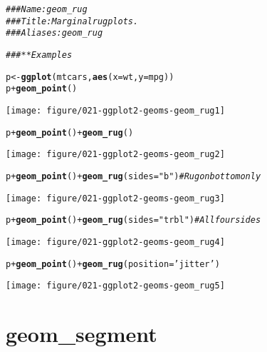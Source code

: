 \documentclass[a4paper,titlepage]{tufte-handout}\usepackage[]{graphicx}\usepackage[]{color}
\makeatletter
\def\maxwidth{ %
  \ifdim\Gin@nat@width>\linewidth
    \linewidth
  \else
    \Gin@nat@width
  \fi
}
\newcommand{\hlstr}[1]{\textcolor[rgb]{0.192,0.494,0.8}{#1}}%
\newcommand{\hlcom}[1]{\textcolor[rgb]{0.678,0.584,0.686}{\textit{#1}}}%
\newcommand{\hlopt}[1]{\textcolor[rgb]{0,0,0}{#1}}%
\newcommand{\hlstd}[1]{\textcolor[rgb]{0.345,0.345,0.345}{#1}}%
\newcommand{\hlkwb}[1]{\textcolor[rgb]{0.69,0.353,0.396}{#1}}%
\newcommand{\hlkwc}[1]{\textcolor[rgb]{0.333,0.667,0.333}{#1}}%
\newcommand{\hlkwd}[1]{\textcolor[rgb]{0.737,0.353,0.396}{\textbf{#1}}}%
\newenvironment{kframe}{%
 \def\at@end@of@kframe{}%
 \ifinner\ifhmode%
  \def\at@end@of@kframe{\end{minipage}}%
  \begin{minipage}{\columnwidth}%
 \fi\fi%
 \def\FrameCommand##1{\hskip\@totalleftmargin \hskip-\fboxsep
 \colorbox{shadecolor}{##1}\hskip-\fboxsep
     \hskip-\linewidth \hskip-\@totalleftmargin \hskip\columnwidth}%
 \MakeFramed {\advance\hsize-\width
   \@totalleftmargin\z@ \linewidth\hsize
   \@setminipage}}%
 {\par\unskip\endMakeFramed%
 \at@end@of@kframe}
\newenvironment{knitrout}{}{} %
\makeatother
\begin{document}
\begin{knitrout}
\color{fgcolor}\begin{kframe}
\begin{alltt}
\hlcom{### Name: geom_rug}
\hlcom{### Title: Marginal rug plots.}
\hlcom{### Aliases: geom_rug}

\hlcom{### ** Examples}

\hlstd{p} \hlkwb{<-} \hlkwd{ggplot}\hlstd{(mtcars,} \hlkwd{aes}\hlstd{(}\hlkwc{x}\hlstd{=wt,} \hlkwc{y}\hlstd{=mpg))}
\hlstd{p} \hlopt{+} \hlkwd{geom_point}\hlstd{()}
\end{alltt}
\end{kframe}
\texttt{[image: figure/021-ggplot2-geoms-geom\_rug1]} 
\begin{kframe}\begin{alltt}
\hlstd{p} \hlopt{+} \hlkwd{geom_point}\hlstd{()} \hlopt{+} \hlkwd{geom_rug}\hlstd{()}
\end{alltt}
\end{kframe}
\texttt{[image: figure/021-ggplot2-geoms-geom\_rug2]} 
\begin{kframe}\begin{alltt}
\hlstd{p} \hlopt{+} \hlkwd{geom_point}\hlstd{()} \hlopt{+} \hlkwd{geom_rug}\hlstd{(}\hlkwc{sides}\hlstd{=}\hlstr{"b"}\hlstd{)}    \hlcom{# Rug on bottom only}
\end{alltt}
\end{kframe}
\texttt{[image: figure/021-ggplot2-geoms-geom\_rug3]} 
\begin{kframe}\begin{alltt}
\hlstd{p} \hlopt{+} \hlkwd{geom_point}\hlstd{()} \hlopt{+} \hlkwd{geom_rug}\hlstd{(}\hlkwc{sides}\hlstd{=}\hlstr{"trbl"}\hlstd{)} \hlcom{# All four sides}
\end{alltt}
\end{kframe}
\texttt{[image: figure/021-ggplot2-geoms-geom\_rug4]} 
\begin{kframe}\begin{alltt}
\hlstd{p} \hlopt{+} \hlkwd{geom_point}\hlstd{()} \hlopt{+} \hlkwd{geom_rug}\hlstd{(}\hlkwc{position}\hlstd{=}\hlstr{'jitter'}\hlstd{)}
\end{alltt}
\end{kframe}
\texttt{[image: figure/021-ggplot2-geoms-geom\_rug5]} 

\end{knitrout}


\section{geom\_segment}
\end{document}
